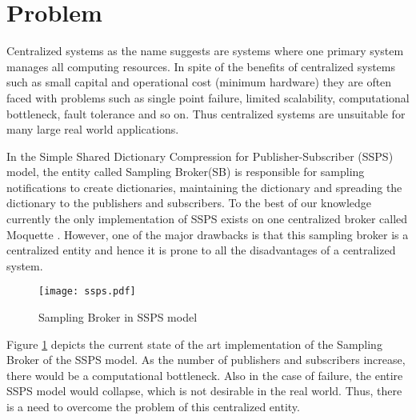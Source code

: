 \section{Problem}

Centralized systems as the name suggests are systems where one primary system manages all computing resources. In spite of the benefits of centralized systems such as small capital and operational cost (minimum hardware) they are often faced with problems such as single point failure, limited scalability, computational bottleneck, fault tolerance and so on. Thus centralized systems are unsuitable for many large real world applications.

In the Simple Shared Dictionary Compression for Publisher-Subscriber (SSPS) model, the entity called Sampling Broker(SB) is responsible for sampling notifications to create dictionaries, maintaining the dictionary and spreading the dictionary to the publishers and subscribers. To the best of our knowledge currently the only implementation of SSPS exists on one centralized broker called Moquette \parencite{moquette}. However, one of the major drawbacks is that this sampling broker is a centralized entity and hence it is prone to all the disadvantages of a centralized system.

\makeatletter
\setlength{\@fptop}{0pt}
\makeatother

\begin{figure}[t!]
\centering
\texttt{[image: ssps.pdf]}
\caption{Sampling Broker in SSPS model}\label{figures:ssps}
\end{figure}

Figure \ref{figures:ssps} depicts the current state of the art implementation of the Sampling Broker of the SSPS model. As the number of publishers and subscribers increase, there would be a computational bottleneck. Also in the case of failure, the entire SSPS model would collapse, which is not desirable in the real world. Thus, there is a need to overcome the problem of this centralized entity. 
